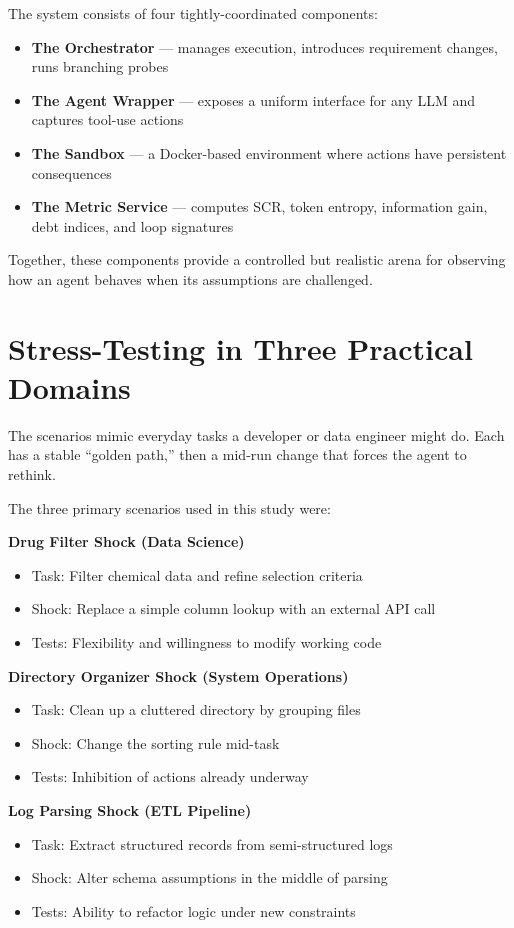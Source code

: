 \documentclass[12pt,a4paper]{report}
\begin{document}
The system consists of four tightly-coordinated components:
\begin{itemize}
    \item \textbf{The Orchestrator} — manages execution, introduces requirement changes, runs branching probes
    \item \textbf{The Agent Wrapper} — exposes a uniform interface for any LLM and captures tool-use actions
    \item \textbf{The Sandbox} — a Docker-based environment where actions have persistent consequences
    \item \textbf{The Metric Service} — computes SCR, token entropy, information gain, debt indices, and loop signatures
\end{itemize}

Together, these components provide a controlled but realistic arena for observing how an agent behaves when its assumptions are challenged.

\section{Stress-Testing in Three Practical Domains}
The scenarios mimic everyday tasks a developer or data engineer might do. Each has a stable “golden path,” then a mid-run change that forces the agent to rethink.

The three primary scenarios used in this study were:

\textbf{Drug Filter Shock (Data Science)}
\begin{itemize}
    \item Task: Filter chemical data and refine selection criteria
    \item Shock: Replace a simple column lookup with an external API call
    \item Tests: Flexibility and willingness to modify working code
\end{itemize}

\textbf{Directory Organizer Shock (System Operations)}
\begin{itemize}
    \item Task: Clean up a cluttered directory by grouping files
    \item Shock: Change the sorting rule mid-task
    \item Tests: Inhibition of actions already underway
\end{itemize}

\textbf{Log Parsing Shock (ETL Pipeline)}
\begin{itemize}
    \item Task: Extract structured records from semi-structured logs
    \item Shock: Alter schema assumptions in the middle of parsing
    \item Tests: Ability to refactor logic under new constraints
\end{itemize}
\end{document}
